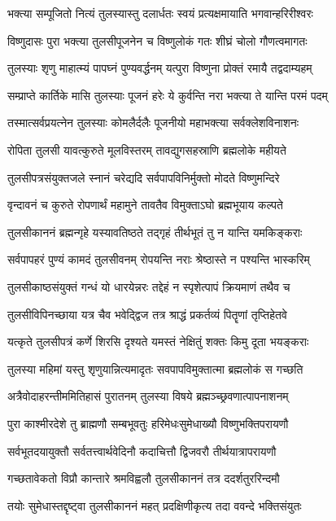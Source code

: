 \twolineshloka
{भक्त्या सम्पूजितो नित्यं तुलस्यास्तु दलार्धतः}
{स्वयं प्रत्यक्षमायाति भगवान्हरिरीश्वरः} %

\twolineshloka
{विष्णुदासः पुरा भक्त्या तुलसीपूजनेन च}
{विष्णुलोकं गतः शीघ्रं चोलो गौणत्वमागतः} %

\twolineshloka
{तुलस्याः शृणु माहात्म्यं पापघ्नं पुण्यवर्द्धनम्}
{यत्पुरा विष्णुना प्रोक्तं रमायै तद्वदाम्यहम्} %

\twolineshloka
{सम्प्राप्ते कार्तिके मासि तुलस्याः पूजनं हरेः}
{ये कुर्वन्ति नरा भक्त्या ते यान्ति परमं पदम्} %

\twolineshloka
{तस्मात्सर्वप्रयत्नेन तुलस्याः कोमलैर्दलैः}
{पूजनीयो महाभक्त्या सर्वक्लेशविनाशनः} %

\twolineshloka
{रोपिता तुलसी यावत्कुरुते मूलविस्तरम्}
{तावद्युगसहस्राणि ब्रह्मलोके महीयते} %

\twolineshloka
{तुलसीपत्रसंयुक्तजले स्नानं चरेद्यदि}
{सर्वपापविनिर्मुक्तो मोदते विष्णुमन्दिरे} %

\twolineshloka
{वृन्दावनं च कुरुते रोपणार्थं महामुने}
{तावतैव विमुक्ताऽघो ब्रह्मभूयाय कल्पते} %

\twolineshloka
{तुलसीकाननं ब्रह्मन्गृहे यस्यावतिष्ठते}
{तद्गृहं तीर्थभूतं तु न यान्ति यमकिङ्कराः} %

\twolineshloka
{सर्वपापहरं पुण्यं कामदं तुलसीवनम्}
{रोपयन्ति नराः श्रेष्ठास्ते न पश्यन्ति भास्करिम्} %

\twolineshloka
{तुलसीकाष्ठसंयुक्तं गन्धं यो धारयेन्नरः}
{तद्देहं न स्पृशेत्पापं क्रियमाणं तथैव च} %

\twolineshloka
{तुलसीविपिनच्छाया यत्र चैव भवेद्द्विज}
{तत्र श्राद्धं प्रकर्तव्यं पितॄणां तृप्तिहेतवे} %

\twolineshloka
{यत्कृते तुलसीपत्रं कर्णे शिरसि दृश्यते}
{यमस्तं नेक्षितुं शक्तः किमु दूता भयङ्कराः} %

\twolineshloka
{तुलस्या महिमां यस्तु शृणुयान्नित्यमादृतः}
{सवपापविमुक्तात्मा ब्रह्मलोकं स गच्छति} %

\twolineshloka
{अत्रैवोदाहरन्तीममितिहासं पुरातनम्}
{तुलस्या विषये ब्रह्मञ्च्छ्रवणात्पापनाशनम्} %

\twolineshloka
{पुरा काश्मीरदेशे तु ब्राह्मणौ सम्बभूवतुः}
{हरिमेधःसुमेधाख्यौ विष्णुभक्तिपरायणौ} %

\twolineshloka
{सर्वभूतदयायुक्तौ सर्वतत्त्वार्थवेदिनौ}
{कदाचित्तौ द्विजवरौ तीर्थयात्रापरायणौ} %

\twolineshloka
{गच्छतावेकतो विप्रौ कान्तारे श्रमविह्वलौ}
{तुलसीकाननं तत्र ददर्शतुररिन्दमौ} %

\twolineshloka
{तयोः सुमेधास्तद्दृष्ट्वा तुलसीकाननं महत्}
{प्रदक्षिणीकृत्य तदा ववन्दे भक्तिसंयुतः} %

